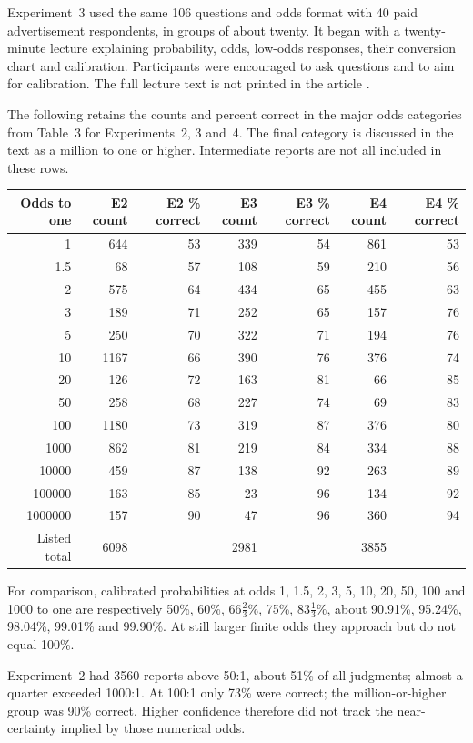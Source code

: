 Experiment~3 used the same 106 questions and odds format with 40 paid
advertisement respondents, in groups of about twenty. It began with a
twenty-minute lecture explaining probability, odds, low-odds responses,
their conversion chart and calibration. Participants were encouraged to ask
questions and to aim for calibration. The full lecture text is not printed
in the article \cite[p.~557]{FischhoffSlovicLichtenstein1977Certainty}.

The following retains the counts and percent correct in the major odds
categories from Table~3 for Experiments~2, 3 and~4. The final category is
discussed in the text as a million to one or higher. Intermediate reports
are not all included in these rows.
\begin{center}\small
\begin{tabular}{rrrrrrr}
Odds to one&E2 count&E2 \% correct&E3 count&E3 \% correct&E4 count&E4 \% correct\\\hline
1&644&53&339&54&861&53\\
1.5&68&57&108&59&210&56\\
2&575&64&434&65&455&63\\
3&189&71&252&65&157&76\\
5&250&70&322&71&194&76\\
10&1167&66&390&76&376&74\\
20&126&72&163&81&66&85\\
50&258&68&227&74&69&83\\
100&1180&73&319&87&376&80\\
1000&862&81&219&84&334&88\\
10000&459&87&138&92&263&89\\
100000&163&85&23&96&134&92\\
1000000&157&90&47&96&360&94\\\hline
Listed total&6098&&2981&&3855&
\end{tabular}
\end{center}
For comparison, calibrated probabilities at odds 1, 1.5, 2, 3, 5, 10,
20, 50, 100 and 1000 to one are respectively 50\%, 60\%,
\(66\tfrac23\%\), 75\%, \(83\tfrac13\%\), about 90.91\%,
95.24\%, 98.04\%, 99.01\% and 99.90\%. At still larger finite
odds they approach but do not equal 100\%.

Experiment~2 had 3560 reports above 50:1, about 51\% of all judgments;
almost a quarter exceeded 1000:1. At 100:1 only 73\% were correct;
the million-or-higher group was 90\% correct. Higher confidence therefore
did not track the near-certainty implied by those numerical odds.

